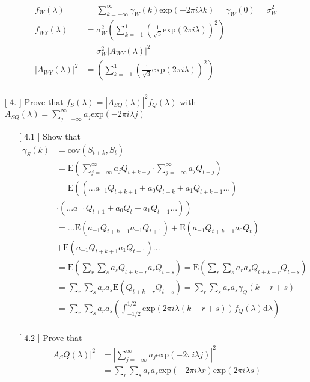 \documentclass[10pt,a4paper]{article}
\begin{document}
\begin{enumerate}
\begin{enumerate}
		\begin{align*}
			f_W(\lambda) &= \sum_{k=-\infty}^{\infty} \gamma_{W}(k) \text{exp}(-2\pi i \lambda k) = \gamma_{W}(0) = \sigma_{W}^2\\
			f_{WY}(\lambda)&= \sigma_{W}^2 \left( \sum_{k=-1}^{1}(\frac{1}{\sqrt{3}}\text{exp}(2\pi i \lambda))^2\right) \\
			&= \sigma_{W}^2 |A_{WY}(\lambda)|^2 \\
			|A_{WY}(\lambda)|^2 &= \left( \sum_{k=-1}^{1}(\frac{1}{\sqrt{3}}\text{exp}(2\pi i \lambda))^2\right) \\
		\end{align*}
		\end{enumerate}
	\item[[ 4.]] Prove that $f_S(\lambda) = |A_{SQ}(\lambda)|^2 f_Q(\lambda)$ with $A_{SQ}(\lambda) = \sum_{j=-\infty}^{\infty}a_j \text{exp}(-2\pi i \lambda j)$
		\begin{enumerate}
		\item[[ 4.1]] Show that 
		\begin{align*}
			\gamma_{S}(k) &= \text{cov}(S_{t+k},S_t) \\
			&= \text{E}(\sum_{j=-\infty}^{\infty}a_j Q_{t+k-j} \cdot \sum_{j=-\infty}^{\infty}a_j Q_{t-j} ) \\
			&= \text{E} \left( (...a_{-1} Q_{t+k+1} + a_0 Q_{t+k} + a_1 Q_{t+k-1} ...) \right. \\
			&\cdot (...a_{-1} Q_{t+1} + a_0 Q_t + a_1 Q_{t-1} ...) \left. \right) \\
			&= ... \text{E}(a_{-1} Q_{t+k+1} a_{-1} Q_{t+1}) + \text{E}(a_{-1} Q_{t+k+1} a_0 Q_t) \\
			&+ \text{E}(a_{-1} Q_{t+k+1} a_1 Q_{t-1})... \\
			&= \text{E}(\sum_{r} \sum_{s} a_s Q_{t+k-r} a_r Q_{t-s}) = \text{E}(\sum_{r} \sum_{s} a_r a_s Q_{t+k-r} Q_{t-s}) \\
			&= \sum_{r} \sum_{s} a_r a_s \text{E}(Q_{t+k-r} Q_{t-s}) = \sum_{r} \sum_{s} a_r a_s \gamma_Q (k-r+s) \\
			&= \sum_{r} \sum_{s} a_r a_s \left( \int_{-1/2}^{1/2} \text{exp}(2\pi i \lambda (k-r+s)) f_Q(\lambda) \text{d}\lambda \right) \\
		\end{align*}
		\item[[ 4.2]] Prove that
		\begin{align*}
			|A_SQ(\lambda)|^2 &= |\sum_{j=-\infty}^{\infty}a_j \text{exp}(-2\pi i \lambda j)|^2 \\
			&= \sum_{r} \sum_{s} a_r a_s  \text{exp}(-2\pi i \lambda r) \text{exp}(2\pi i \lambda s) \\

\end{align*}
\end{enumerate}
\end{enumerate}
\end{document}
